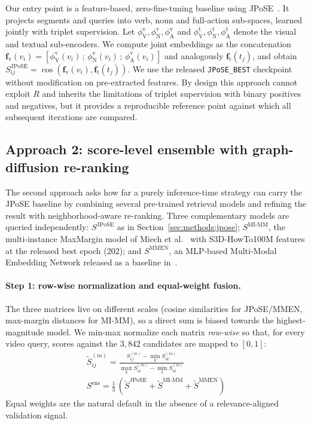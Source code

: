Our entry point is a feature-based, zero-fine-tuning baseline using JPoSE~\cite{wray2019jpose}. It projects segments and queries into verb, noun and full-action sub-spaces, learned jointly with triplet supervision. Let $\phi^{\mathrm{v}}_{\mathrm{V}}, \phi^{\mathrm{v}}_{\mathrm{N}}, \phi^{\mathrm{v}}_{\mathrm{A}}$ and $\phi^{\mathrm{t}}_{\mathrm{V}}, \phi^{\mathrm{t}}_{\mathrm{N}}, \phi^{\mathrm{t}}_{\mathrm{A}}$ denote the visual and textual sub-encoders. We compute joint embeddings as the concatenation $\mathbf{f}_{\mathrm{v}}(v_i) = [\phi^{\mathrm{v}}_{\mathrm{V}}(v_i)\,;\,\phi^{\mathrm{v}}_{\mathrm{N}}(v_i)\,;\,\phi^{\mathrm{v}}_{\mathrm{A}}(v_i)]$ and analogously $\mathbf{f}_{\mathrm{t}}(t_j)$, and obtain $S^{\mathrm{JPoSE}}_{ij} = \cos(\mathbf{f}_{\mathrm{v}}(v_i), \mathbf{f}_{\mathrm{t}}(t_j))$. We use the released \texttt{JPoSE\_BEST} checkpoint without modification on pre-extracted features. By design this approach cannot exploit $R$ and inherits the limitations of triplet supervision with binary positives and negatives, but it provides a reproducible reference point against which all subsequent iterations are compared.

\subsection{Approach 2: score-level ensemble with graph-diffusion re-ranking}
\label{sec:methods:ensemble}

The second approach asks how far a purely inference-time strategy can carry the JPoSE baseline by combining several pre-trained retrieval models and refining the result with neighborhood-aware re-ranking. Three complementary models are queried independently: $S^{\mathrm{JPoSE}}$ as in Section~\ref{sec:methods:jpose}; $S^{\mathrm{MI\text{-}MM}}$, the multi-instance MaxMargin model of Miech et al.~\cite{miech2020milnce} with S3D-HowTo100M features at the released best epoch (202); and $S^{\mathrm{MMEN}}$, an MLP-based Multi-Modal Embedding Network released as a baseline in~\cite{wray2019jpose}.

\paragraph{Step 1: row-wise normalization and equal-weight fusion.}
The three matrices live on different scales (cosine similarities for JPoSE/MMEN, max-margin distances for MI-MM), so a direct sum is biased towards the highest-magnitude model. We min-max normalize each matrix \emph{row-wise} so that, for every video query, scores against the $3{,}842$ candidates are mapped to $[0,1]$:
\begin{gather}
\widetilde{S}^{(m)}_{ij} = \frac{S^{(m)}_{ij} - \min_k S^{(m)}_{ik}}{\max_k S^{(m)}_{ik} - \min_k S^{(m)}_{ik}}\, \\
S^{\mathrm{ens}} = \tfrac{1}{3}\,(\widetilde{S}^{\mathrm{JPoSE}} + \widetilde{S}^{\mathrm{MI\text{-}MM}} + \widetilde{S}^{\mathrm{MMEN}})
\label{eq:ensemble}
\end{gather}
Equal weights are the natural default in the absence of a relevance-aligned validation signal.

